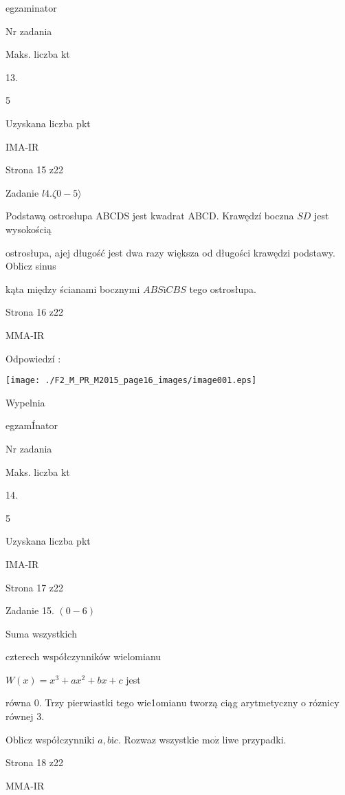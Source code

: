 \documentclass[a4paper,12pt]{article}
\begin{document}
egzaminator

Nr zadania

Maks. liczba kt

13.

5

Uzyskana liczba pkt

IMA-IR

Strona 15 z22





Zadanie $l4. \zeta 0-5\rangle$

Podstawą ostrosłupa ABCDS jest kwadrat ABCD. Krawędzí boczna $SD$ jest wysokością

ostrosłupa, ajej długość jest dwa razy większa od długości krawędzi podstawy. Oblicz sinus

kąta między ścianami bocznymi $ABS\mathrm{i}CBS$ tego ostrosłupa.

Strona 16 z22

MMA-IR





Odpowiedzí :
\begin{center}
\texttt{[image: ./F2\_M\_PR\_M2015\_page16\_images/image001.eps]}
\end{center}
Wypelnia

egzamÍnator

Nr zadania

Maks. liczba kt

14.

5

Uzyskana liczba pkt

IMA-IR

Strona 17 z22





Zadanie 15. $(0-6)$

Suma wszystkich

czterech współczynników wielomianu

$W(x)=x^{3}+ax^{2}+bx+c$ jest

równa 0. Trzy pierwiastki tego wie1omianu tworzą ciąg arytmetyczny o róznicy równej 3.

Oblicz współczynniki $a, b \mathrm{i}c$. Rozwaz wszystkie $\mathrm{m}\mathrm{o}\dot{\mathrm{z}}$ liwe przypadki.

Strona 18 z22

MMA-IR
\end{document}
